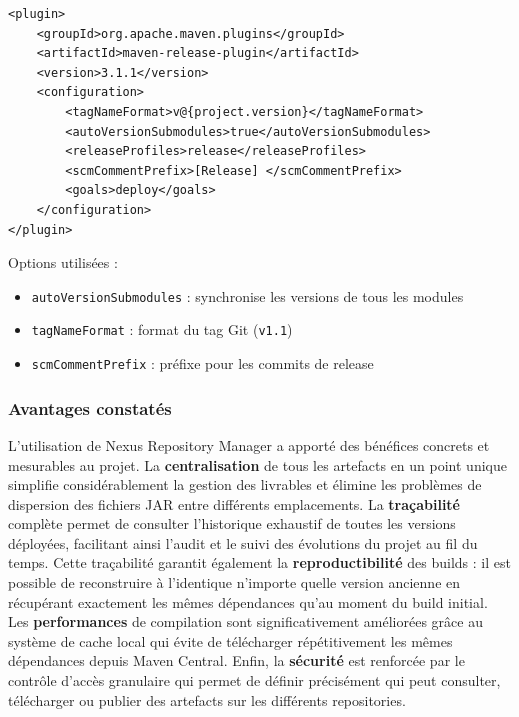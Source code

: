 \vspace{0.3cm}
\begin{lstlisting}[language=enhancedxml, caption=Configuration du plugin release]
<plugin>
    <groupId>org.apache.maven.plugins</groupId>
    <artifactId>maven-release-plugin</artifactId>
    <version>3.1.1</version>
    <configuration>
        <tagNameFormat>v@{project.version}</tagNameFormat>
        <autoVersionSubmodules>true</autoVersionSubmodules>
        <releaseProfiles>release</releaseProfiles>
        <scmCommentPrefix>[Release] </scmCommentPrefix>
        <goals>deploy</goals>
    </configuration>
</plugin>
\end{lstlisting}

Options utilisées :
\begin{itemize}
    \item \texttt{autoVersionSubmodules} : synchronise les versions de tous les modules
    \item \texttt{tagNameFormat} : format du tag Git (\texttt{v1.1})
    \item \texttt{scmCommentPrefix} : préfixe pour les commits de release
\end{itemize}

\subsubsection{Avantages constatés}

L'utilisation de Nexus Repository Manager a apporté des bénéfices concrets et mesurables au projet. La \textbf{centralisation} de tous les artefacts en un point unique simplifie considérablement la gestion des livrables et élimine les problèmes de dispersion des fichiers JAR entre différents emplacements. La \textbf{traçabilité} complète permet de consulter l'historique exhaustif de toutes les versions déployées, facilitant ainsi l'audit et le suivi des évolutions du projet au fil du temps. Cette traçabilité garantit également la \textbf{reproductibilité} des builds : il est possible de reconstruire à l'identique n'importe quelle version ancienne en récupérant exactement les mêmes dépendances qu'au moment du build initial. Les \textbf{performances} de compilation sont significativement améliorées grâce au système de cache local qui évite de télécharger répétitivement les mêmes dépendances depuis Maven Central. Enfin, la \textbf{sécurité} est renforcée par le contrôle d'accès granulaire qui permet de définir précisément qui peut consulter, télécharger ou publier des artefacts sur les différents repositories.


